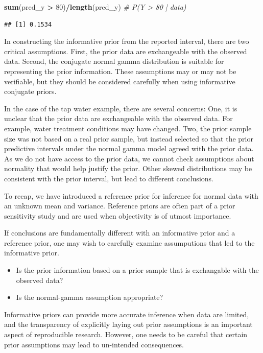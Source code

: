 \documentclass[]{book}
\newenvironment{Shaded}{\begin{snugshade}}{\end{snugshade}}
\newcommand{\KeywordTok}[1]{\textcolor[rgb]{0.13,0.29,0.53}{\textbf{#1}}}
\newcommand{\DecValTok}[1]{\textcolor[rgb]{0.00,0.00,0.81}{#1}}
\newcommand{\StringTok}[1]{\textcolor[rgb]{0.31,0.60,0.02}{#1}}
\newcommand{\CommentTok}[1]{\textcolor[rgb]{0.56,0.35,0.01}{\textit{#1}}}
\newcommand{\OperatorTok}[1]{\textcolor[rgb]{0.81,0.36,0.00}{\textbf{#1}}}
\newcommand{\NormalTok}[1]{#1}
\theoremstyle{definition}
\theoremstyle{definition}
\theoremstyle{definition}
\theoremstyle{remark}
\begin{document}
\begin{Shaded}
\begin{Highlighting}[]
\KeywordTok{sum}\NormalTok{(pred_y }\OperatorTok{>}\StringTok{ }\DecValTok{80}\NormalTok{)}\OperatorTok{/}\KeywordTok{length}\NormalTok{(pred_y)  }\CommentTok{# P(Y > 80 | data)}
\end{Highlighting}
\end{Shaded}

\begin{verbatim}
## [1] 0.1534
\end{verbatim}

In constructing the informative prior from the reported interval, there
are two critical assumptions. First, the prior data are exchangeable
with the observed data. Second, the conjugate normal gamma distribution
is suitable for representing the prior information. These assumptions
may or may not be verifiable, but they should be considered carefully
when using informative conjugate priors.

In the case of the tap water example, there are several concerns: One,
it is unclear that the prior data are exchangeable with the observed
data. For example, water treatment conditions may have changed. Two, the
prior sample size was not based on a real prior sample, but instead
selected so that the prior predictive intervals under the normal gamma
model agreed with the prior data. As we do not have access to the prior
data, we cannot check assumptions about normality that would help
justify the prior. Other skewed distributions may be consistent with the
prior interval, but lead to different conclusions.

To recap, we have introduced a reference prior for inference for normal
data with an unknown mean and variance. Reference priors are often part
of a prior sensitivity study and are used when objectivity is of utmost
importance.

If conclusions are fundamentally different with an informative prior and
a reference prior, one may wish to carefully examine assumputions that
led to the informative prior.

\begin{itemize}
\item
  Is the prior information based on a prior sample that is exchangable
  with the observed data?
\item
  Is the normal-gamma assumption appropriate?
\end{itemize}

Informative priors can provide more accurate inference when data are
limited, and the transparency of explicitly laying out prior assumptions
is an important aspect of reproducible research. However, one needs to
be careful that certain prior assumptions may lead to un-intended
consequences.
\end{document}
